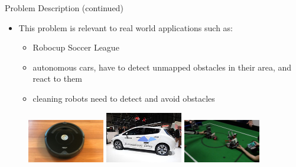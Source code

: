 \documentclass[10pt]{beamer}
\begin{document}
\begin{frame}{Problem Description (continued)}
\begin{itemize}
    \item This problem is relevant to real world applications such as:  
    \begin{itemize}
    \item Robocup Soccer League
    \item autonomous cars, have to detect unmapped obstacles in their area, and react to them
    \item cleaning robots need to detect and avoid obstacles
\end{itemize}
\end{itemize}
\begin{figure}[t]
		\centering
		\includegraphics[width=0.3\textwidth]{images/roomba.jpg}
		\includegraphics[width=0.3\textwidth]{images/car.jpg}
		\includegraphics[width=0.3\textwidth]{images/soccer.jpg}
\end{figure}\hfill
\end{frame}
\end{document}
